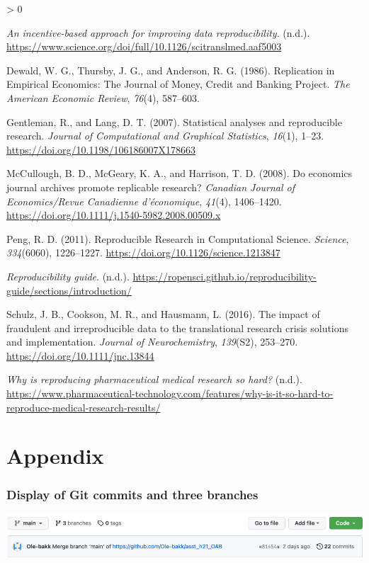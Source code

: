 \documentclass[
  12pt,
]{article}
\newlength{\cslhangindent}
\newenvironment{CSLReferences}[2] %
 {%
  \setlength{\parindent}{0pt}
  \ifodd #1 \everypar{\setlength{\hangindent}{\cslhangindent}}\ignorespaces\fi
  \ifnum #2 > 0
  \setlength{\parskip}{#2\baselineskip}
  \fi
 }%
 {}
\begin{document}
\hypertarget{refs}{}
\begin{CSLReferences}{1}{0}
\leavevmode\hypertarget{ref-Science.org}{}%
\emph{An incentive-based approach for improving data reproducibility}.
(n.d.).
\url{https://www.science.org/doi/full/10.1126/scitranslmed.aaf5003}

\leavevmode\hypertarget{ref-dewald1986}{}%
Dewald, W. G., Thursby, J. G., and Anderson, R. G. (1986). Replication
in {Empirical Economics}: {The Journal} of {Money}, {Credit} and
{Banking Project}. \emph{The American Economic Review}, \emph{76}(4),
587--603.

\leavevmode\hypertarget{ref-gentleman2007}{}%
Gentleman, R., and Lang, D. T. (2007). Statistical analyses and
reproducible research. \emph{Journal of Computational and Graphical
Statistics}, \emph{16}(1), 1--23.
\url{https://doi.org/10.1198/106186007X178663}

\leavevmode\hypertarget{ref-mccullough2008}{}%
McCullough, B. D., McGeary, K. A., and Harrison, T. D. (2008). Do
economics journal archives promote replicable research? \emph{Canadian
Journal of Economics/Revue Canadienne d'économique}, \emph{41}(4),
1406--1420. \url{https://doi.org/10.1111/j.1540-5982.2008.00509.x}

\leavevmode\hypertarget{ref-peng2011}{}%
Peng, R. D. (2011). Reproducible {Research} in {Computational Science}.
\emph{Science}, \emph{334}(6060), 1226--1227.
\url{https://doi.org/10.1126/science.1213847}

\leavevmode\hypertarget{ref-Git-reproducabilty}{}%
\emph{Reproducibility guide}. (n.d.).
\url{https://ropensci.github.io/reproducibility-guide/sections/introduction/}

\leavevmode\hypertarget{ref-schulz2016}{}%
Schulz, J. B., Cookson, M. R., and Hausmann, L. (2016). The impact of
fraudulent and irreproducible data to the translational research crisis
{{}} solutions and implementation. \emph{Journal of Neurochemistry},
\emph{139}(S2), 253--270. \url{https://doi.org/10.1111/jnc.13844}

\leavevmode\hypertarget{ref-Pharm-tech}{}%
\emph{Why is reproducing pharmaceutical medical research so hard?}
(n.d.).
\url{https://www.pharmaceutical-technology.com/features/why-is-it-so-hard-to-reproduce-medical-research-results/}

\end{CSLReferences}

\hypertarget{appendix}{%
\section{Appendix}\label{appendix}}

\hypertarget{display-of-git-commits-and-three-branches}{%
\subsubsection{Display of Git commits and three
branches}\label{display-of-git-commits-and-three-branches}}

\includegraphics{images/paste-7A7BFE4C.png}
\end{document}
